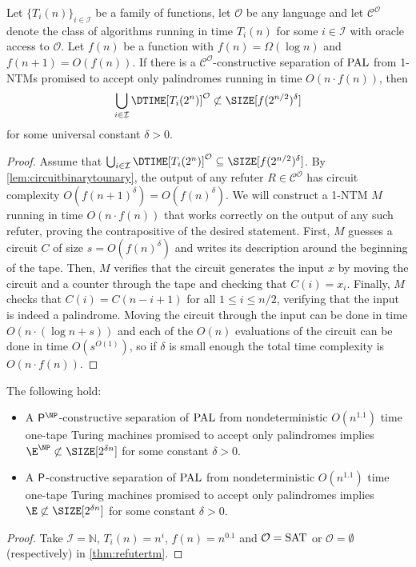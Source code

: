\begin{theorem}
    \label{thm:refutertm}
    Let $\{T_i(n)\}_{i \in \mathcal{I}}$ be a family of functions, let $\mathcal{O}$ be any language
    and let $\mathcal{C}^\mathcal{O}$ denote the class of algorithms
    running in time $T_i(n)$ for some $i \in \mathcal{I}$ with oracle access to $\mathcal{O}$. 
    Let $f(n)$ be a function with $f(n) = \Omega(\log n)$ and $f(n+1) = O(f(n))$.
    If there is a $\mathcal{C}^\mathcal{O}$-constructive separation of $\mathrm{PAL}$ from
    1-NTMs promised to accept only palindromes running in time $O(n \cdot f(n))$, then 
    $$\bigcup_{i\in \mathcal{I}} \DTIME[T_i(2^n)]^{\mathcal{O}} \not\subset \SIZE[f(2^{n/2})^\delta]$$
    for some universal constant $\delta > 0$.  
\end{theorem}
\begin{proof}
Assume that $\bigcup_{i\in \mathcal{I}} \DTIME[T_i(2^n)]^{\mathcal{O}} \subseteq \SIZE[f(2^{n/2})^\delta]$. 
By \cref{lem:circuitbinarytounary}, the output of any refuter $R \in \mathcal{C}^\mathcal{O}$ has circuit complexity
$O(f(n+1)^\delta) = O(f(n)^\delta)$. We will construct a 1-NTM $M$ running in time $O(n \cdot f(n))$
that works correctly on the output of any such refuter, proving the contrapositive of the desired statement. 
First, $M$ guesses a circuit $C$ of size $s = O(f(n)^\delta)$ and writes its description around the beginning of the tape.
Then, $M$ verifies that the circuit generates the input $x$ by moving the circuit and a counter through the tape
and checking that $C(i) = x_i$. Finally, $M$ checks that $C(i) = C(n-i+1)$ for all $1 \leq i \leq n/2$, verifying that
the input is indeed a palindrome. Moving the circuit through the input can be done in time $O(n \cdot (\log n + s))$ and each
of the $O(n)$ evaluations of the circuit can be done in time $O(s^{O(1)})$, so if $\delta$ is small enough the total
time complexity is $O(n \cdot f(n))$. 
\end{proof}

\begin{corollary}
The following hold:
\begin{itemize}
    \item A $\PTIME^{\NP}$-constructive separation of $\mathrm{PAL}$ from nondeterministic $O(n^{1.1})$ time
    one-tape Turing machines promised to accept only palindromes implies $\E^{\NP} \not \subset \SIZE[2^{\delta n}]$ for some constant $\delta >0$.
	    
    \item A $\mathsf{P}$-constructive separation of $\mathrm{PAL}$ from nondeterministic $O(n^{1.1})$ time
    one-tape Turing machines promised to accept only palindromes implies $\E \not \subset \SIZE[2^{\delta n}]$ for some constant $\delta >0$.
\end{itemize}
\end{corollary}
\begin{proof}
Take $\mathcal{I} = \mathbb{N}$, $T_i(n) = n^i$, $f(n) = n^{0.1}$ and $\mathcal{O} = \mathrm{SAT}$ or $\mathcal{O} = \emptyset$ (respectively) in \cref{thm:refutertm}.
\end{proof}

